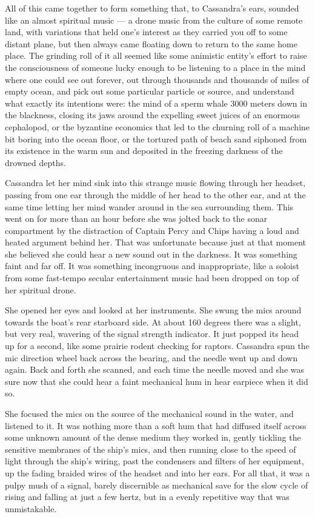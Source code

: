 \documentclass[
]{scrbook}
\begin{document}
All of this came together to form something that, to Cassandra's ears,
sounded like an almost spiritual music --- a drone music from the
culture of some remote land, with variations that held one's interest as
they carried you off to some distant plane, but then always came
floating down to return to the same home place. The grinding roll of it
all seemed like some animistic entity's effort to raise the
consciousness of someone lucky enough to be listening to a place in the
mind where one could see out forever, out through thousands and
thousands of miles of empty ocean, and pick out some particular particle
or source, and understand what exactly its intentions were: the mind of
a sperm whale 3000 meters down in the blackness, closing its jaws around
the expelling sweet juices of an enormous cephalopod, or the byzantine
economics that led to the churning roll of a machine bit boring into the
ocean floor, or the tortured path of beach sand siphoned from its
existence in the warm sun and deposited in the freezing darkness of the
drowned depths.

Cassandra let her mind sink into this strange music flowing through her
headset, passing from one ear through the middle of her head to the
other ear, and at the same time letting her mind wander around in the
sea surrounding them. This went on for more than an hour before she was
jolted back to the sonar compartment by the distraction of Captain Percy
and Chips having a loud and heated argument behind her. That was
unfortunate because just at that moment she believed she could hear a
new sound out in the darkness. It was something faint and far off. It
was something incongruous and inappropriate, like a soloist from some
fast-tempo secular entertainment music had been dropped on top of her
spiritual drone.

She opened her eyes and looked at her instruments. She swung the mics
around towards the boat's rear starboard side. At about 160 degrees
there was a slight, but very real, wavering of the signal strength
indicator. It just popped its head up for a second, like some prairie
rodent checking for raptors. Cassandra spun the mic direction wheel back
across the bearing, and the needle went up and down again. Back and
forth she scanned, and each time the needle moved and she was sure now
that she could hear a faint mechanical hum in hear earpiece when it did
so.

She focused the mics on the source of the mechanical sound in the water,
and listened to it. It was nothing more than a soft hum that had
diffused itself across some unknown amount of the dense medium they
worked in, gently tickling the sensitive membranes of the ship's mics,
and then running close to the speed of light through the ship's wiring,
past the condensers and filters of her equipment, up the fading braided
wires of the headset and into her ears. For all that, it was a pulpy
mush of a signal, barely discernible as mechanical save for the slow
cycle of rising and falling at just a few hertz, but in a evenly
repetitive way that was unmistakable.
\end{document}
